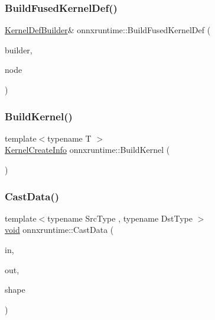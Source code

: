 \mbox{\label{namespaceonnxruntime_aeeec7d99f7a4d683744e082b8ab62de8}} 
\subsubsection{\texorpdfstring{Build\+Fused\+Kernel\+Def()}{BuildFusedKernelDef()}}
{\footnotesize\ttfamily \mbox{\hyperlink{classonnxruntime_1_1KernelDefBuilder}{Kernel\+Def\+Builder}}\& onnxruntime\+::\+Build\+Fused\+Kernel\+Def (\begin{DoxyParamCaption}\item[{\mbox{\hyperlink{classonnxruntime_1_1KernelDefBuilder}{Kernel\+Def\+Builder}} \&}]{builder,  }\item[{const \mbox{\hyperlink{classonnxruntime_1_1Node}{onnxruntime\+::\+Node}} \&}]{node }\end{DoxyParamCaption})}

\mbox{\label{namespaceonnxruntime_ac7d6fcc4957abf36800a00b296827813}} 
\subsubsection{\texorpdfstring{Build\+Kernel()}{BuildKernel()}}
{\footnotesize\ttfamily template$<$typename T $>$ \\
\mbox{\hyperlink{structonnxruntime_1_1KernelCreateInfo}{Kernel\+Create\+Info}} onnxruntime\+::\+Build\+Kernel (\begin{DoxyParamCaption}{ }\end{DoxyParamCaption})}

\mbox{\label{namespaceonnxruntime_a35e6aa9711c7a7b1cf830f0326d88633}} 
\subsubsection{\texorpdfstring{Cast\+Data()}{CastData()}}
{\footnotesize\ttfamily template$<$typename Src\+Type , typename Dst\+Type $>$ \\
\mbox{\hyperlink{mlasi_8h_a88f941d423cb2a819b70a1358982b1a6}{void}} onnxruntime\+::\+Cast\+Data (\begin{DoxyParamCaption}\item[{const \mbox{\hyperlink{classonnxruntime_1_1Tensor}{Tensor}} $\ast$}]{in,  }\item[{\mbox{\hyperlink{classonnxruntime_1_1Tensor}{Tensor}} $\ast$}]{out,  }\item[{const \mbox{\hyperlink{classonnxruntime_1_1TensorShape}{Tensor\+Shape}} \&}]{shape }\end{DoxyParamCaption})\hspace{0.3cm}{\ttfamily [inline]}}

